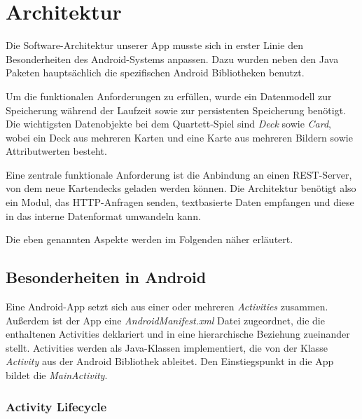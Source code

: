 \chapter{Architektur}
\label{cha:architektur}

Die Software-Architektur unserer App musste sich in erster Linie den Besonderheiten des Android-Systems anpassen. Dazu wurden neben den Java Paketen hauptsächlich die spezifischen Android Bibliotheken benutzt.

Um die funktionalen Anforderungen zu erfüllen, wurde ein Datenmodell zur Speicherung während der Laufzeit sowie zur persistenten Speicherung benötigt. Die wichtigsten Datenobjekte bei dem Quartett-Spiel sind \emph{Deck} sowie \emph{Card}, wobei ein Deck aus mehreren Karten und eine Karte aus mehreren Bildern sowie Attributwerten besteht.

Eine zentrale funktionale Anforderung ist die Anbindung an einen REST-Server, von dem neue Kartendecks geladen werden können. Die Architektur benötigt also ein Modul, das HTTP-Anfragen senden, textbasierte Daten empfangen und diese in das interne Datenformat umwandeln kann.

Die eben genannten Aspekte werden im Folgenden näher erläutert.

\section{Besonderheiten in Android}
\label{sec:besonderheiten_android}

Eine Android-App setzt sich aus einer oder mehreren \emph{Activities} zusammen. Außerdem ist der App eine \emph{AndroidManifest.xml} Datei zugeordnet, die die enthaltenen Activities deklariert und in eine hierarchische Beziehung zueinander stellt. Activities werden als Java-Klassen implementiert, die von der Klasse \emph{Activity} aus der Android Bibliothek ableitet. Den Einstiegspunkt in die App bildet die \emph{MainActivity}.

\subsection{Activity Lifecycle}

